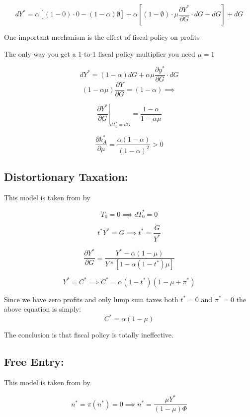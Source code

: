  $$
 dY^* = \alpha \left[ (1 - 0 ) \cdot 0 - (1 - \alpha) \emptyset \right] +
 \alpha \left[ (1 - \emptyset) \cdot \mu \frac{\partial Y^*}{\partial G} \cdot dG - dG  \right] + dG
 $$
 
One important mechanism is the effect of fiscal policy on profits
 
 The only way you get a 1-to-1 fiscal policy multiplier you need $\mu = 1$

 $$
 dY^* = ( 1 - \alpha) dG + \alpha \mu \frac{\partial y^*}{\partial G} \cdot dG
 $$
 $$
 ( 1- \alpha \mu) \frac{\partial Y}{\partial G} = ( 1 - \alpha ) \implies 
 $$
 
$$
 \left. \frac{\partial Y^*}{\partial G} \right\rvert_{dT^*_0 = dG} = \frac{1 - \alpha}{1 - \alpha \mu} 
$$
 
\begin{equation}\tag{$m^*_A$}
     \frac{\partial k_A^*}{\partial \mu} = \frac{\alpha (1 - \alpha)}{( 1 - \alpha )^2} > 0
\end{equation}
 
 
\subsection{Distortionary Taxation: \textcite{molana_note_1992}}
This model is taken from  by \textcite{molana_note_1992}


$$
T_0 = 0 \implies dT_0^* = 0
$$

$$
t^*Y^* = G \implies t^* = \frac{G}{Y^*}
$$

$$
\frac { \partial Y ^ { * } } { \partial G } = \frac{Y^* - \alpha(1-\mu)}{Y* \left[ 1 - \alpha (1 - t^*) \mu  \right]}
$$


$$
Y^* = C^* \implies C^* = \alpha ( 1- t^*)(1 - \mu + \pi^*)
$$

Since we have zero profits and only lump sum taxes both  $t^* = 0 $ and $\pi^* = 0$ the above equation is simply:
$$
C^* = \alpha \left( 1 - \mu  \right)
$$

The conclusion is that fiscal policy is totally ineffective. 


\subsection{Free Entry: \textcite{startz_monopolistic_1989}}
This model is taken from  by \textcite{startz_monopolistic_1989}

$$
n^* = \pi(n^*) = 0 \implies n^* = \frac{\mu Y^*}{(1 - \mu) \Phi}
$$

